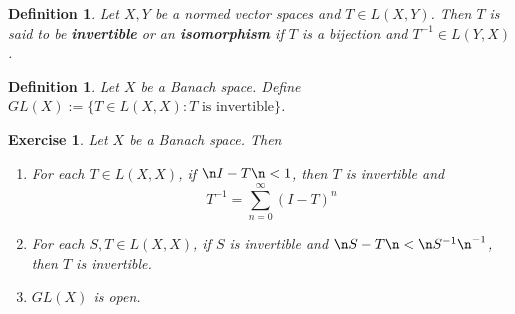 \documentclass[12pt]{amsart}
\newtheorem{defn}[thm]{Definition}
\newtheorem{ex}[thm]{Exercise}
\begin{document}
\begin{defn}
	Let $X,Y$ be a normed vector spaces and $T \in L(X,Y)$. Then $T$ is said to be \textbf{invertible} or an \textbf{isomorphism} if $T$ is a bijection and $T^{-1} \in L(Y,X)$.
\end{defn}

\begin{defn}
	Let $X$ be a Banach space. Define $GL(X) := \{T \in L(X,X): T \text{ is invertible}\}$.
\end{defn}

\begin{ex}
	Let $X$ be a Banach space. Then 
	\begin{enumerate}
		\item For each $T \in L(X,X)$, if $\n I- T \n < 1$, then $T$ is invertible and $$T^{-1} = \sum_{n=0}^{\infty}(I-T)^n$$
		\item For each $S,T \in L(X,X)$, if $S$ is invertible and $\n S-T \n < \n S^{-1} \n^{-1}$, then $T$ is invertible. 
		\item $GL(X)$ is open.
	\end{enumerate}
\end{ex}
\end{document}
